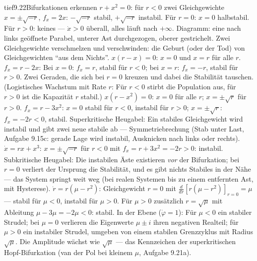 \begin{loesungkarte}{tief}{9.22}{Bifurkationen erkennen}
$r + x^{2} = 0$: für $r < 0$ zwei Gleichgewichte $x = \pm\sqrt{-r}$, $f_x = 2x$: $-\sqrt{-r}$ stabil, $+\sqrt{-r}$ instabil. Für $r = 0$: $x = 0$ halbstabil. Für $r > 0$: keines --- $\dot x > 0$ überall, alles läuft nach $+\infty$. Diagramm: eine nach links geöffnete Parabel, unterer Ast durchgezogen, oberer gestrichelt. Zwei Gleichgewichte verschmelzen und verschwinden: die Geburt (oder der Tod) von Gleichgewichten \enquote{aus dem Nichts}.
$x(r - x) = 0$: $x = 0$ und $x = r$ für alle $r$. $f_x = r - 2x$: Bei $x = 0$: $f_x = r$, stabil für $r < 0$; bei $x = r$: $f_x = -r$, stabil für $r > 0$. Zwei Geraden, die sich bei $r = 0$ kreuzen und dabei die Stabilität tauschen. (Logistisches Wachstum mit Rate $r$: Für $r < 0$ stirbt die Population aus, für $r > 0$ ist die Kapazität $r$ stabil.)
$x(r - x^{2}) = 0$: $x = 0$ für alle $r$; $x = \pm\sqrt r$ für $r > 0$. $f_x = r - 3x^{2}$: $x = 0$ stabil für $r < 0$, instabil für $r > 0$; $x = \pm\sqrt r$: $f_x = -2r < 0$, stabil. Superkritische Heugabel: Ein stabiles Gleichgewicht wird instabil und gibt zwei neue stabile ab --- Symmetriebrechung (Stab unter Last, Aufgabe 9.15c: gerade Lage wird instabil, Ausknicken nach links oder rechts). $\dot x = rx + x^{3}$: $x = \pm\sqrt{-r}$ für $r < 0$ mit $f_x = r + 3x^{2} = -2r > 0$: instabil. Subkritische Heugabel: Die instabilen Äste existieren \emph{vor} der Bifurkation; bei $r = 0$ verliert der Ursprung die Stabilität, und es gibt nichts Stabiles in der Nähe --- das System springt weit weg (bei realen Systemen bis zu einem entfernten Ast, mit Hysterese).
$\dot r = r(\mu - r^{2})$: Gleichgewicht $r = 0$ mit $\frac{d}{dr}[r(\mu - r^{2})]_{r = 0} = \mu$ --- stabil für $\mu < 0$, instabil für $\mu > 0$. Für $\mu > 0$ zusätzlich $r = \sqrt\mu$ mit Ableitung $\mu - 3\mu = -2\mu < 0$: stabil. In der Ebene ($\dot\varphi = 1$): Für $\mu < 0$ ein stabiler Strudel; bei $\mu = 0$ verlieren die Eigenwerte $\mu\pm i$ ihren negativen Realteil; für $\mu > 0$ ein instabiler Strudel, umgeben von einem stabilen Grenzzyklus mit Radius $\sqrt\mu$. Die Amplitude wächst wie $\sqrt\mu$ --- das Kennzeichen der superkritischen Hopf-Bifurkation (van der Pol bei kleinem $\mu$, Aufgabe 9.21a).

\end{loesungkarte}
